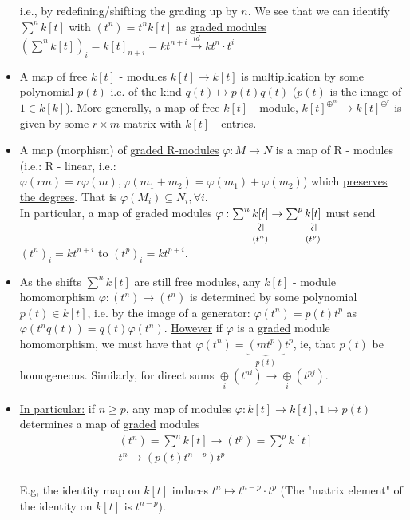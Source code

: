 \documentclass[11pt,a4paper]{report}
\newcommand{\vertsimeq}{\rotatebox{90}{$\,\simeq$}}
\newcommand{\simequalto}[2]{\underset{\scriptstyle\overset{\mkern4mu\vertsimeq}{#2}}{#1}}
\begin{document}
\begin{itemize}
              i.e., by redefining/shifting the grading up by $n$. We see that we can identify $\sum^nk[t]$ with $(t^n) = t^nk[t]$ as \underline{graded modules} $(\sum^nk[t])_i = k[t]_{n+i} = kt^{n+i} \xrightarrow{id} kt^n\cdot t^i$\\
              \item
              A map of free $k[t]$ - modules $k[t] \rightarrow k[t]$ is multiplication by some polynomial $p(t)$ i.e. of the kind $q(t) \mapsto p(t)q(t)$ ($p(t)$ is the image of $1 \in k[k]$). More generally, a map of free $k[t]$ - module, $k[t]^{\oplus^{m}} \rightarrow k[t]^{\oplus^{r}}$ is given by some $r \times m$ matrix with $k[t]$ - entries.\\
              \item
              A map (morphism) of \underline{graded R-modules} $\varphi: M \rightarrow N$ is a map of R - modules (i.e.: R - linear, i.e.: $\varphi(rm) = r \varphi(m), \varphi(m_1 + m_2) = \varphi(m_1) + \varphi(m_2)$) which \underline{preserves the degrees}. That is $\varphi(M_i) \subseteq N_i, \forall i$.\\
              In particular, a map of graded modules $\varphi: \sum^n\simequalto{k[t]}{(t^n)} \rightarrow \sum^p\simequalto{k[t]}{(t^p)}$ must send $(t^n)_i = kt^{n+i}$ to $(t^p)_i = kt^{p+i}$.\\
              \item
              As the shifts $\sum^nk[t]$ are still free modules, any $k[t]$ - module homomorphism $\varphi: (t^n) \rightarrow (t^n)$ is determined by some polynomial $p(t) \in k[t]$, i.e. by the image of a generator: $\varphi(t^n) = p(t)t^p$ as $\varphi(t^nq(t)) = q(t)\varphi(t^n)$. \underline{However} if $\varphi$ is a \underline{graded} module homomorphism, we must have that $\varphi(t^n) = \underbrace{(mt^p)}_{p(t)}t^p$, ie, that $p(t)$ be homogeneous. Similarly, for direct sums $\underset{i}{\oplus}(t^{ni}) \rightarrow \underset{i}{\oplus}(t^{pj})$.\\
              \item
              \underline{In particular:} if $n \ge p$, any map of modules $\varphi: k[t] \rightarrow k[t], 1 \mapsto p(t)$ determines a map of \underline{graded} modules
              \begin{align*}
                &(t^n) = \sum^nk[t] \rightarrow (t^p) = \sum^pk[t]\\
                &t^n \mapsto (p(t)t^{n-p})t^p
              \end{align*}
              \\
              E.g, the identity map on $k[t]$ induces $t^n \mapsto t^{n-p} \cdot t^p$ (The "matrix element" of the identity on $k[t]$ is $t^{n-p}$).
              \end{itemize}
\end{document}
